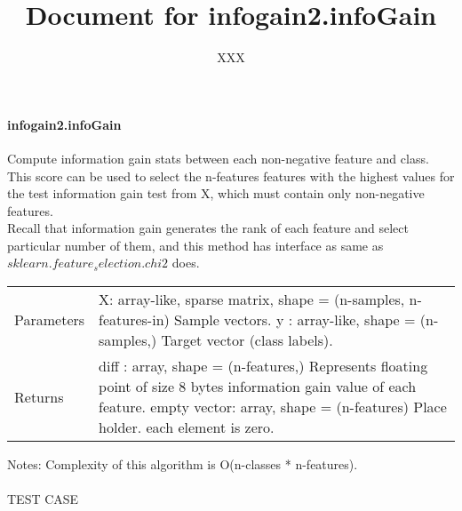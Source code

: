\documentclass{article}
\title{Document for infogain2.infoGain}
\author{XXX}
\begin{document}
	\maketitle
	\paragraph{infogain2.infoGain\\}
	Compute information gain stats between each non-negative feature and class.\\
	This score can be used to select the n-features features with the highest values for the test information gain test from X, which must contain only non-negative features.\\
	Recall that information gain generates the rank of each feature and select particular number of them, and this method has interface as same as $sklearn.feature_selection.chi2$ does.\\
	\begin{center}
	\begin{tabularx}{\textwidth}{lX}
	 Parameters & X: array-like, sparse matrix, shape = {(n-samples, n-features-in) \newline Sample} vectors.
				y : array-like, shape = (n-samples,)\newline
				Target vector (class labels). \\
	 Returns & diff : array, shape = (n-features,) \newline
	 		Represents floating point of size 8 bytes 
	 		information gain value of each feature.
			empty vector: array, shape = (n-features) \newline
			Place holder. each element is zero. \\ 
	 \end{tabularx}
	 \end{center}
	 Notes: Complexity of this algorithm is O(n-classes * n-features).\\
	 \\
	 \newpage
	 TEST CASE\\
\end{document}
